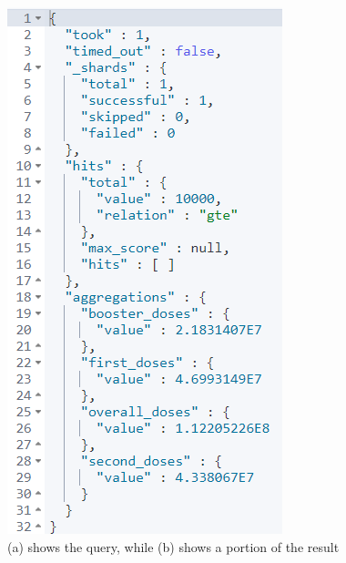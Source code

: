 \documentclass{article}[IEEEtran]
\begin{document}
\begin{figure}[H]
\begin{center}
\begin{minipage}[b]{0.4\textwidth}
    \includegraphics[width=\textwidth, frame]{Answer_Query_2.PNG}
     \subcaption{}
  \end{minipage}
  \caption{(a) shows the query, while (b) shows a portion of the result}
\end{center}
\end{figure}
\end{document}
